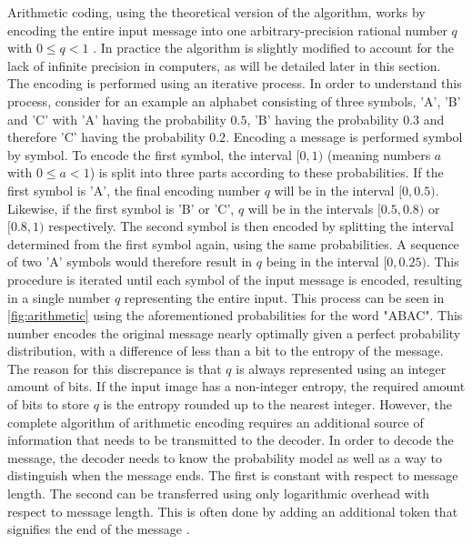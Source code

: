 Arithmetic coding, using the theoretical version of the algorithm, works by encoding the entire input message into one arbitrary-precision rational number $q$ with $0 \leq q < 1$ \citep{said_introduction_2023}. In practice the algorithm is slightly modified to account for the lack of infinite precision in computers, as will be detailed later in this section. The encoding is performed using an iterative process. In order to understand this process, consider for an example an alphabet consisting of three symbols, 'A', 'B' and 'C' with 'A' having the probability $0.5$, 'B' having the probability $0.3$ and therefore 'C' having the probability $0.2$. Encoding a message is performed symbol by symbol. To encode the first symbol, the interval $[0,1)$ (meaning numbers $a$ with $0 \leq a < 1$) is split into three parts according to these probabilities. If the first symbol is 'A', the final encoding number $q$ will be in the interval $[0,0.5)$. Likewise, if the first symbol is 'B' or 'C', $q$ will be in the intervals $[0.5,0.8)$ or $[0.8,1)$ respectively. The second symbol is then encoded by splitting the interval determined from the first symbol again, using the same probabilities. A sequence of two 'A' symbols would therefore result in $q$ being in the interval $[0,0.25)$. This procedure is iterated until each symbol of the input message is encoded, resulting in a single number $q$ representing the entire input. This process can be seen in \autoref{fig:arithmetic} using the aforementioned probabilities for the word "ABAC". This number encodes the original message nearly optimally given a perfect probability distribution, with a difference of less than a bit to the entropy of the message. The reason for this discrepance is that $q$ is always represented using an integer amount of bits. If the input image has a non-integer entropy, the required amount of bits to store $q$ is the entropy rounded up to the nearest integer. However, the complete algorithm of arithmetic encoding requires an additional source of information that needs to be transmitted to the decoder. In order to decode the message, the decoder needs to know the probability model as well as a way to distinguish when the message ends. The first is constant with respect to message length. The second can be transferred using only logarithmic overhead with respect to message length. This is often done by adding an additional token that signifies the end of the message \citep{said_introduction_2023}.

